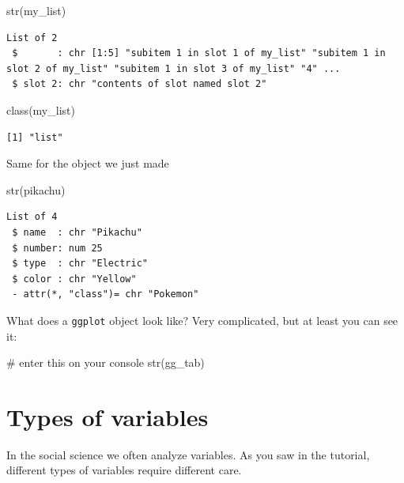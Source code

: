 \documentclass[
  letterpaper,
]{book}
\newenvironment{Shaded}{\begin{snugshade}}{\end{snugshade}}
\newcommand{\CommentTok}[1]{\textcolor[rgb]{0.37,0.37,0.37}{#1}}
\newcommand{\FunctionTok}[1]{\textcolor[rgb]{0.28,0.35,0.67}{#1}}
\newcommand{\NormalTok}[1]{\textcolor[rgb]{0.00,0.23,0.31}{#1}}
\theoremstyle{definition}
\theoremstyle{definition}
\theoremstyle{plain}
\theoremstyle{definition}
\theoremstyle{plain}
\theoremstyle{plain}
\theoremstyle{remark}
\begin{document}
\begin{Shaded}
\begin{Highlighting}[]
\FunctionTok{str}\NormalTok{(my\_list)}
\end{Highlighting}
\end{Shaded}

\begin{verbatim}
List of 2
 $       : chr [1:5] "subitem 1 in slot 1 of my_list" "subitem 1 in slot 2 of my_list" "subitem 1 in slot 3 of my_list" "4" ...
 $ slot 2: chr "contents of slot named slot 2"
\end{verbatim}

\begin{Shaded}
\begin{Highlighting}[]
\FunctionTok{class}\NormalTok{(my\_list)}
\end{Highlighting}
\end{Shaded}

\begin{verbatim}
[1] "list"
\end{verbatim}

Same for the object we just made

\begin{Shaded}
\begin{Highlighting}[]
\FunctionTok{str}\NormalTok{(pikachu)}
\end{Highlighting}
\end{Shaded}

\begin{verbatim}
List of 4
 $ name  : chr "Pikachu"
 $ number: num 25
 $ type  : chr "Electric"
 $ color : chr "Yellow"
 - attr(*, "class")= chr "Pokemon"
\end{verbatim}

What does a \texttt{ggplot} object look like? Very complicated, but at
least you can see it:

\begin{Shaded}
\begin{Highlighting}[]
\CommentTok{\# enter this on your console}
\FunctionTok{str}\NormalTok{(gg\_tab)}
\end{Highlighting}
\end{Shaded}

\hypertarget{types-of-variables}{%
\section{Types of variables}\label{types-of-variables}}

In the social science we often analyze variables. As you saw in the
tutorial, different types of variables require different care.
\end{document}
